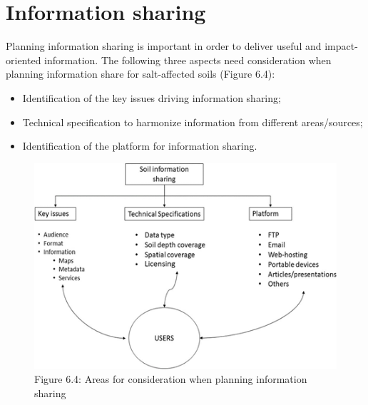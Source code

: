 \documentclass[
  10pt,
  b5paper,
]{book}
\providecommand{\tightlist}{%
  \setlength{\itemsep}{0pt}\setlength{\parskip}{0pt}}
\begin{document}
\hypertarget{information-sharing}{%
\section{Information sharing}\label{information-sharing}}

Planning information sharing is important in order to deliver useful and impact-oriented information. The following three aspects need consideration when planning information share for salt-affected soils (Figure 6.4):

\begin{itemize}
\tightlist
\item
  Identification of the key issues driving information sharing;
\item
  Technical specification to harmonize information from different areas/sources;
\item
  Identification of the platform for information sharing.
\end{itemize}

\begin{figure}
\centering
\includegraphics{figures/images/Figure6.4.png}
\caption{Figure 6.4: Areas for consideration when planning information sharing}
\end{figure}
\end{document}

